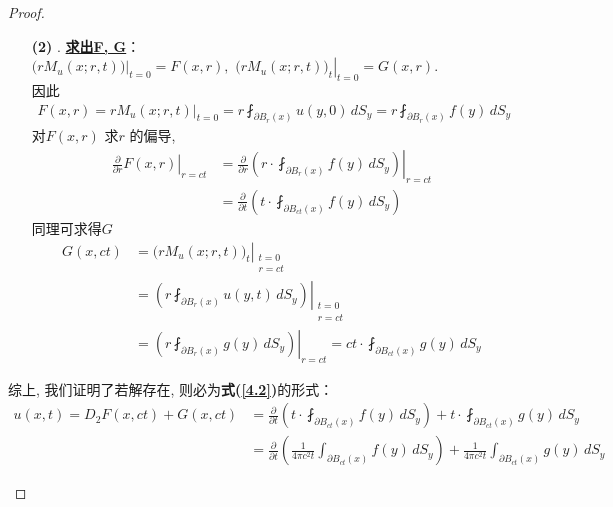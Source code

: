 \begin{thm}
\begin{proof}
\begin{enumerate}
\begin{enumerate}
					\vspace*{4em}
					
					\item[\textbf{(2)}]. \underline{\textbf{求出F, G}}：$\left. \Big( r M_u(x ; r , t) \Big) \right|_{t = 0} 
					= F(x , r) , \,\, 
					\left. \Big( rM_{u}(x ; r , t) \Big)_t \right|_{t = 0} 
					= G(x , r)$. \\
					因此
					\begin{align*}
						F(x , r) 
						= r M_u(x ; r , t) \Big|_{t = 0} 
						= r \fint_{\partial B_r(x)} u(y , 0) \, dS_y 
						= r \fint_{\partial B_r(x)} f(y) \, dS_y
					\end{align*}
					对$F(x , r)$ 求$r$ 的偏导, 
					\begin{align*}
						\left. \frac{\partial}{\partial r} F(x , r) \right|_{r = ct} 
						&= \left. \frac{\partial}{\partial r} \left( r \cdot \fint_{\partial B_{r}(x)} f(y) \, dS_y \right) \right|_{r = ct} \\
						&= \frac{\partial}{\partial t} \left( t \cdot \fint_{\partial B_{ct}(x)} f(y) \, dS_y \right)
					\end{align*}
					同理可求得$G$
					\begin{align*}
						G(x , ct) 
						&= \left. \Big( rM_{u}(x ; r , t) \Big)_t \right|_{\substack{t = 0 \\ r = ct}} \\
						&=  \left. \left( r \fint_{\partial B_r(x)} u(y , t) \, dS_y \right) \right|_{\substack{t = 0 \\ r = ct}} \\
						&= \left. \left( r \fint_{\partial B_r(x)} g(y) \, dS_y \right) \right|_{r = ct} 
						= ct \cdot \fint_{\partial B_{ct}(x)} g(y) \, dS_y
					\end{align*}
				\end{enumerate}
				
				\newpage
				
				综上, 我们证明了若解存在, 则必为\textbf{式(\ref{4.2})}的形式：
				\begin{align*}
					u(x , t) 
					= D_2 F(x , ct) + G(x , ct) 
					&= \frac{\partial}{\partial t} \left( t \cdot \fint_{\partial B_{ct}(x)} f(y) \, dS_y \right) 
					+ t \cdot \fint_{\partial B_{ct}(x)} g(y) \, dS_y \\
					&= \frac{\partial}{\partial t} \left( \frac{1}{4\pi c^2 t} \int_{\partial B_{ct}(x)} f(y) \, dS_y \right) 
					+ \frac{1}{4\pi c^2 t} \int_{\partial B_{ct}(x)} g(y) \, dS_y 
				\end{align*}
				

\end{enumerate}
\end{proof}
\end{thm}
